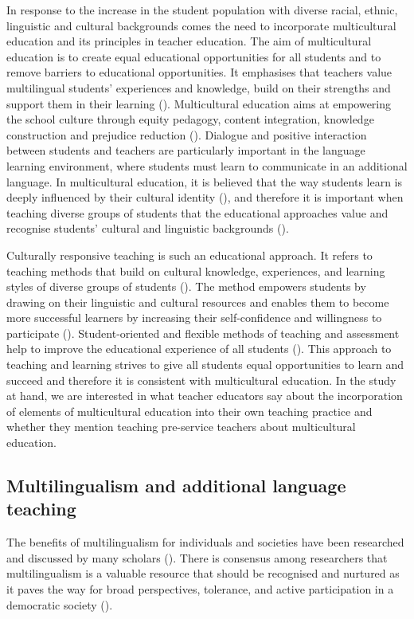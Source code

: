 \documentclass[output=paper]{langscibook}
\begin{document}
{In response to the increase in the student population with diverse racial, ethnic, linguistic and cultural backgrounds comes the need to incorporate multicultural education and its principles in teacher education. The aim of multicultural education is to create equal educational opportunities for all students and to remove barriers to educational opportunities. It emphasises that teachers value multilingual students’ experiences and knowledge, build on their strengths and support them in their learning} (\citealt{Gay2018,Nieto2010}){. Multicultural education aims at empowering the school culture through equity pedagogy, content integration, knowledge construction and prejudice reduction} (\citealt{Banks2016}){. Dialogue and positive interaction between students and teachers are particularly important in the language learning environment, where students must learn to communicate in an additional language. In multicultural education, it is believed that the way students learn is deeply influenced by their cultural identity} (\citealt{Banks2016}){, and therefore it is important when teaching diverse groups of students that the educational approaches value and recognise students’ cultural and linguistic backgrounds} (\citealt{Gay2018}){.}

{Culturally responsive teaching is such an educational approach. It refers to teaching methods that build on cultural knowledge, experiences, and learning styles of diverse groups of students} (\citealt{Ladson-billings1995-but}){. The method empowers students by drawing on their linguistic and cultural resources and enables them to become more successful learners by increasing their self-confidence and willingness to participate} (\citealt{Gay2018,Ljunggren2016,Prediger2023-1}){. Student-oriented and flexible methods of teaching and assessment help to improve the educational experience of all students} (\citealt{Al-azawei2017}){. This approach to teaching and learning strives to give all students equal opportunities to learn and succeed and therefore it is consistent with multicultural education. In the study at hand, we are interested in what teacher educators say about the incorporation of elements of multicultural education into their own teaching practice and whether they mention teaching pre-service teachers about multicultural education.}

\subsection{Multilingualism and additional language teaching}
\begin{sloppypar}
The benefits of multilingualism for individuals and societies have been researched and discussed by many scholars (\citealt{Chumak-Horbatsch2012,Cummins2000,Garcia2010-1,Garcia2014-4}). There is consensus among researchers that multilingualism is a valuable resource that should be recognised and nurtured as it paves the way for broad perspectives, {tolerance, and active participation in a democratic society} (\citealt{Garcia2014-3,Ljunggren2016}){.}
\end{sloppypar}
\end{document}
